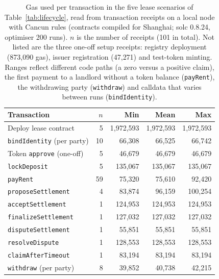 \begin{table}[t]
\centering
\small
\caption{Gas used per transaction in the five lease scenarios of Table~\ref{tab:lifecycle}, read from transaction receipts on a local node with Cancun rules (contracts compiled for Shanghai; solc 0.8.24, optimiser 200 runs). $n$ is the number of receipts (101 in total). Not listed are the three one-off setup receipts: registry deployment (873{,}090 gas), issuer registration (47{,}271) and test-token minting. Ranges reflect different code paths (a zero versus a positive claim), the first payment to a landlord without a token balance (\texttt{payRent}), the withdrawing party (\texttt{withdraw}) and calldata that varies between runs (\texttt{bindIdentity}).}
\label{tab:gas}
\begin{tabular}{@{}lrrrr@{}}
\toprule
Transaction & $n$ & Min & Mean & Max \\
\midrule
Deploy lease contract & 5 & 1{,}972{,}593 & 1{,}972{,}593 & 1{,}972{,}593 \\
\texttt{bindIdentity} (per party) & 10 & 66{,}308 & 66{,}525 & 66{,}742 \\
Token \texttt{approve} (one-off) & 5 & 46{,}679 & 46{,}679 & 46{,}679 \\
\texttt{lockDeposit} & 5 & 135{,}067 & 135{,}067 & 135{,}067 \\
\texttt{payRent} & 59 & 75{,}320 & 75{,}610 & 92{,}420 \\
\texttt{proposeSettlement} & 4 & 83{,}874 & 96{,}159 & 100{,}254 \\
\texttt{acceptSettlement} & 1 & 124{,}953 & 124{,}953 & 124{,}953 \\
\texttt{finalizeSettlement} & 1 & 127{,}032 & 127{,}032 & 127{,}032 \\
\texttt{disputeSettlement} & 1 & 55{,}851 & 55{,}851 & 55{,}851 \\
\texttt{resolveDispute} & 1 & 128{,}553 & 128{,}553 & 128{,}553 \\
\texttt{claimAfterTimeout} & 1 & 83{,}194 & 83{,}194 & 83{,}194 \\
\texttt{withdraw} (per party) & 8 & 39{,}852 & 40{,}738 & 42{,}215 \\
\bottomrule
\end{tabular}
\end{table}
